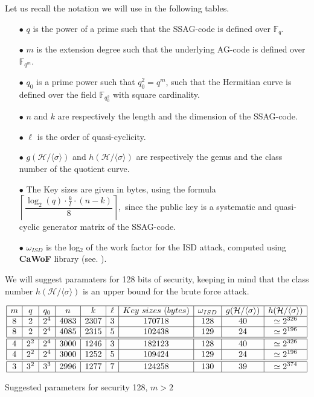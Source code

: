 \documentclass[10pt]{article}
\theoremstyle{definition}
\theoremstyle{definition}
\theoremstyle{definition}
\newcommand{\s}{\vspace{0.3cm}}
\newcommand{\cd}{\cdot}
\newcommand{\calH}{\mathcal{H}}
\newcommand{\fqm}{\mathbb{F}_{q^m}}
\newcommand{\fq}{\mathbb{F}_q}
\newcommand{\w}{\omega}
\begin{document}
\s

Let us recall the notation we will use in the following tables.

\begin{enumerate}
\item[$\bullet$] $q$ is the power of a prime such that the SSAG-code is defined over $\fq$.
\item[$\bullet$] $m$ is the extension degree such that the underlying AG-code is defined over $\fqm$.
\item[$\bullet$] $q_0$ is a prime power such that $q_0^2=q^m$, such that the Hermitian curve is defined over the field $\mathbb{F}_{q_0^2}$ with square cardinality.
\item[$\bullet$] $n$ and $k$ are respectively the length and the dimension of the SSAG-code.
\item[$\bullet$] $\ell$ is the order of quasi-cyclicity.  
\item[$\bullet$] $g(\calH/\langle \sigma \rangle)$ and $h(\calH/\langle \sigma \rangle)$ are respectively the genus and the class number of the quotient curve.
\item[$\bullet$] The Key sizes are given in bytes, using the formula $\left\lceil \dfrac{\log_{2}(q) \cd \frac{k}{l} \cd (n-k)}{8} \right\rceil,$ since the public key is a systematic and quasi-cyclic generator matrix of the SSAG-code.
\item[$\bullet$] $\w_{ISD}$ is the log$_2$ of the work factor for the ISD attack, computed using \textbf{CaWoF} library (see. \cite{CAWOF}).
\end{enumerate}
We will suggest paramaters for 128 bits of security, keeping in mind that the class number $h(\calH/\langle \sigma \rangle)$ is an upper bound for the brute force attack. 

\s

\begin{table}[htbp]
\begin{equation*}
\begin{array}{|c|c|c|c|c|c|c|c|c|c|}
\hline
m & q & q_0 & n & k & \ell & Key \ sizes \ (bytes) & \w_{ISD} & g(\calH/\langle \sigma \rangle) & h(\calH/\langle \sigma \rangle) \\
\hline
8 & 2 & 2^4 & 4083 & 2307 & 3 & 170718 & 128 & 40 & \simeq 2^{326} \\
\hline
8 & 2 & 2^4 & 4085 & 2315 & 5 & 102438 & 129 & 24 & \simeq 2^{196} \\
\hline \hline
4 & 2^2 & 2^4 & 3000 & 1246 & 3 & 182123 & 128 & 40 & \simeq 2^{326} \\
\hline
4 & 2^2 & 2^4 & 3000 & 1252 & 5 & 109424 & 129 & 24 & \simeq 2^{196} \\
\hline \hline
3 & 3^2 & 3^3 & 2996 & 1277 & 7 & 124258 & 130 & 39 & \simeq 2^{374} \\
\hline
\end{array}
\end{equation*}
\caption{Suggested parameters for security 128, $m > 2$}
\end{table}
\end{document}

